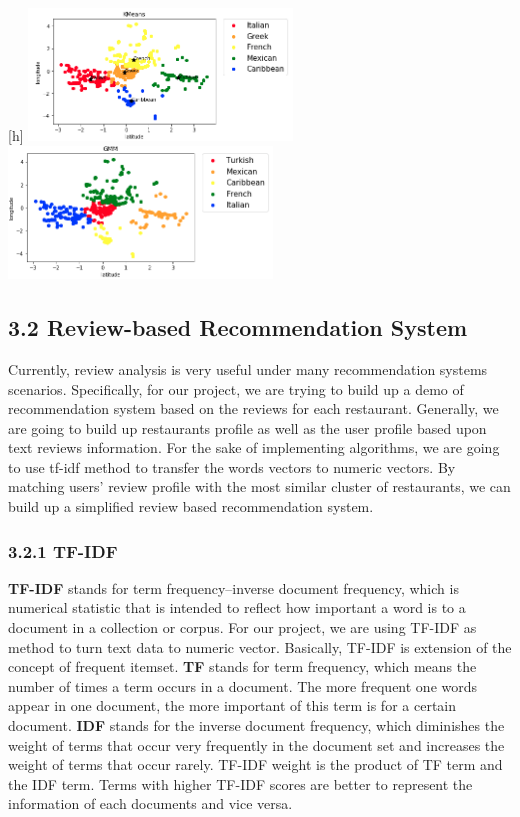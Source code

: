 \documentclass{neu_handout}
\begin{document}
\begin{center}[h]
	\includegraphics[width=70mm,scale=0.5]{kmeans}
	\includegraphics[width=70mm,scale=0.5]{gmm}
\end{center}

\subsection*{3.2 Review-based Recommendation System}
Currently, review analysis is very useful under many recommendation systems scenarios. Specifically, for our project, we are trying to build up a demo of recommendation system based on the reviews for each restaurant. Generally, we are going to build up restaurants profile as well as the user profile based upon text reviews information. For the sake of implementing algorithms, we are going to use tf-idf method to transfer the words vectors to numeric vectors. By matching users’ review profile with the most similar cluster of restaurants, we can build up a simplified review based recommendation system.

\subsubsection*{3.2.1 TF-IDF}
\textbf{TF-IDF} stands for term frequency–inverse document frequency, which is numerical statistic that is intended to reflect how important a word is to a document in a collection or corpus. For our project, we are using TF-IDF as method to turn text data to numeric vector. Basically, TF-IDF is extension of the concept of frequent itemset. \textbf{TF} stands for term frequency, which means the number of times a term occurs in a document. The more frequent one words appear in one document, the more important of this term is for a certain document. \textbf{IDF} stands for the inverse document frequency, which diminishes the weight of terms that occur very frequently in the document set and increases the weight of terms that occur rarely. TF-IDF weight is the product of TF term and the IDF term. Terms with higher TF-IDF scores are better to represent the information of each documents and vice versa.
\end{document}
